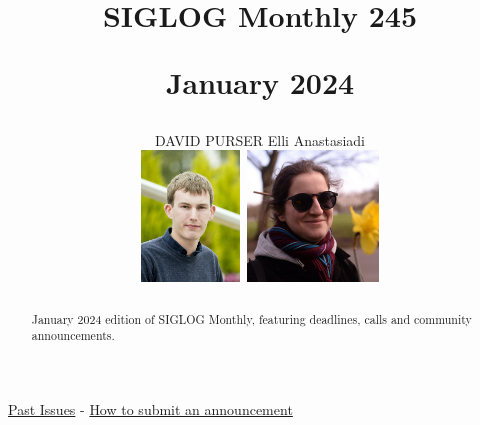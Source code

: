 \documentclass[prodmode,acmtecs]{acmsmall} %
\newcounter{colstart}
\begin{document}
\setcounter{colstart}{\thepage}

\title{{\huge\sc SIGLOG Monthly 245}

 January 2024}
\author{DAVID PURSER
Elli Anastasiadi
\vspace*{-2.6cm}\begin{flushright}\includegraphics[height=35mm]{dp}\ \includegraphics[height=35mm]{ea}\end{flushright}
}



\begin{abstract}
January 2024 edition of SIGLOG Monthly, featuring deadlines, calls and community announcements.
\end{abstract}


\maketitlee

\href{https://lics.siglog.org/newsletters/}{Past Issues}
 - 
\href{https://lics.siglog.org/newsletters/inst.html}{How to submit an announcement}
\end{document}
